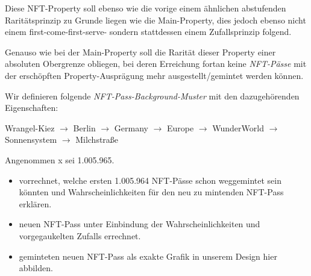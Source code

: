 \begin{NFT-Prop}

Diese NFT-Property soll ebenso wie die vorige einem ähnlichen abstufenden Raritätsprinzip zu Grunde liegen wie die Main-Property, dies jedoch ebenso nicht einem first-come-first-serve- sondern stattdessen einem Zufallsprinzip folgend.

Genauso wie bei der Main-Property soll die Rarität dieser Property einer absoluten Obergrenze obliegen, bei deren Erreichung fortan keine \textit{NFT-Pässe} mit der erschöpften Property-Ausprägung mehr ausgestellt/gemintet werden können.

\vspace{0.3cm}

Wir definieren folgende \textit{NFT-Pass-Background-Muster} mit den dazugehörenden Eigenschaften:




\end{NFT-Prop}


\vspace{0.3cm}

\begin{NFT-Prop}[Community]


\vspace{0.2cm}

Wrangel-Kiez $\rightarrow$ Berlin $\rightarrow$ Germany $\rightarrow$ Europe $\rightarrow$ WunderWorld $\rightarrow$ Sonnensystem $\rightarrow$ Milchstraße

\end{NFT-Prop}



\vspace{0.5cm}


\vspace{0.2cm}

Angenommen x sei 1.005.965.

\begin{itemize}
  \item vorrechnet, welche ersten 1.005.964 NFT-Pässe schon weggemintet sein könnten und Wahrscheinlichkeiten für den neu zu mintenden NFT-Pass erklären.
  \item neuen NFT-Pass unter Einbindung der Wahrscheinlichkeiten und vorgegaukelten Zufalls errechnet.
  \item geminteten neuen NFT-Pass als exakte Grafik in unserem Design hier abbilden.
\end{itemize}


